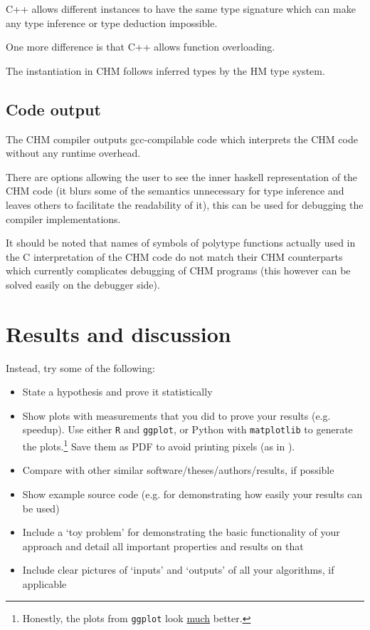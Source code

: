 C++ allows different instances to have the same type signature which can make any type inference or type deduction
impossible.

One more difference is that C++ allows function overloading. %

The instantiation in CHM follows inferred types by the HM type system.

\section{Code output}

The CHM compiler outputs gcc-compilable code which interprets the CHM code without any runtime overhead. %

There are options allowing the user to see the inner haskell representation of the CHM code (it blurs some of the semantics
unnecessary for type inference and leaves others to facilitate the readability of it), this can be used for debugging
the compiler implementations. %

It should be noted that names of symbols of polytype functions actually used in the C interpretation of the CHM code do not match
their CHM counterparts which currently complicates debugging of CHM programs (this however can be solved easily on the debugger side).

\chapter{Results and discussion}

\iffalse
Instead, try some of the following:
\begin{itemize}
\item State a hypothesis and prove it statistically
\item Show plots with measurements that you did to prove your results (e.g. speedup). Use either \texttt{R} and \texttt{ggplot}, or Python with \texttt{matplotlib} to generate the plots.\footnote{Honestly, the plots from \texttt{ggplot} look \underline{much} better.} Save them as PDF to avoid printing pixels (as in ).
\item Compare with other similar software/theses/authors/results, if possible
\item Show example source code (e.g. for demonstrating how easily your results can be used)
\item Include a `toy problem' for demonstrating the basic functionality of your approach and detail all important properties and results on that
\item Include clear pictures of `inputs' and `outputs' of all your algorithms, if applicable
\end{itemize}

